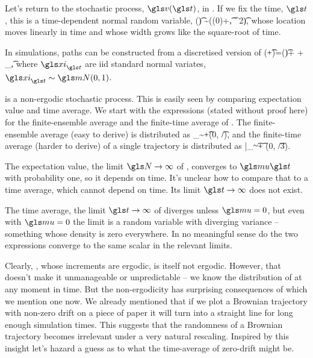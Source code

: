 Let's return to the stochastic process, $\gv(\t)$, in . If we fix the time, $\t$, this is a time-dependent normal random variable,
\be
\gv(\t) \sim \mN(\gv(0)+\gmu\t, \gsigma^2\t),
\ee
whose location moves linearly in time and whose width grows like the square-root of time. 

In simulations, \BM paths can be constructed from a discretised version of 
\be
\gv(\t+\dt)=\gv(\t)+ \gmu \dt + \gsigma \sqrt{\dt} \gxi_\t,
\ee
where $\gxi_\t$ are iid standard normal variates, $\gxi_\t\sim\mN(0,1)$.

\BM is a non-ergodic stochastic process. This is easily seen by comparing expectation value and time average. We start with the expressions (stated without proof here) for the finite-ensemble average and the finite-time average of \BM. The finite-ensemble average (easy to derive) is distributed as
\be
\ave{\gv(\t)}_\N \sim \gmu \t+\mN(0, \t/\N),
\ee
and the finite-time average (harder to derive) of a single \BM trajectory is distributed as
\be
\bar{\gv}_\t \sim \gmu \t + \gsigma \mN(0, \t/3).
\ee

The expectation value, \ie the limit $\N\to\infty$ of , converges to $\gmu \t$ with probability  one, so it depends on time. It's unclear how to compare that to a time average, which cannot depend on time. Its limit $\t\to\infty$ does not exist.

The time average, the limit $\t\to\infty $ of  diverges unless $\gmu=0$, but even with $\gmu=0$ the limit is a random variable with diverging variance -- something whose density 
is zero everywhere. In no meaningful sense do the two expressions converge to the same scalar in the relevant limits.

Clearly, \BM, whose increments are ergodic, is itself not ergodic. However, that doesn't make it unmanageable or unpredictable -- we know the distribution of \BM at any moment in time. But the non-ergodicity has surprising consequences of which we mention one now. We already mentioned that if we plot a Brownian trajectory with non-zero drift on a piece of paper it will turn into a straight line for long enough simulation times. This suggests that the randomness of a Brownian trajectory becomes irrelevant under a very natural rescaling. Inspired by this insight let's hazard a guess as to what the time-average of zero-drift \BM might be. 

